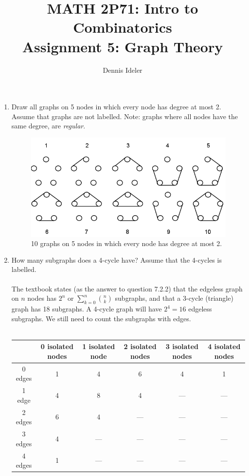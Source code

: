 \documentclass[10pt,a4paper,final]{article}
\author{Dennis Ideler}
\title{MATH 2P71: Intro to Combinatorics\\Assignment 5: Graph Theory}
\begin{document}
\maketitle

\begin{enumerate}
\item %
Draw all graphs on 5 nodes in which every node has degree at most 2. Assume that graphs are not labelled.
Note: graphs where all nodes have the same degree, are \emph{regular}.


\begin{figure}[h!]
  \centering
    \includegraphics[scale=0.5]{q1.png}
  \caption{10 graphs on 5 nodes in which every node has degree at most 2.}
  \label{q1}
\end{figure}

\item %
How many subgraphs does a 4-cycle have? Assume that the 4-cycles is labelled. \\
\\
The textbook states (as the answer to question 7.2.2) that the edgeless graph on $n$ nodes
has $2^n$ or $\sum_{k=0}^n \binom{n}{k}$ subgraphs, and that a 3-cycle (triangle) graph
has 18 subgraphs. A 4-cycle graph will have $2^4 = 16$ edgeless subgraphs.
We still need to count the subgraphs with edges. \\
\\
\begin{tabular}{|c||c|c|c|c|c|}
\hline 
 & 0 isolated nodes & 1 isolated node & 2 isolated nodes & 3 isolated nodes & 4 isolated nodes \\ 
\hline \hline 
0 edges & 1 & 4 & 6 & 4 & 1 \\ 
\hline 
1 edge &  4 & 8 & 4 & --- & --- \\ 
\hline 
2 edges &  6 & 4 & --- & --- & --- \\ 
\hline 
3 edges &  4 & --- & --- & --- & --- \\ 
\hline 
4 edges &  1 & --- & --- & --- & --- \\ 
\hline 
\end{tabular} 


\end{enumerate}
\end{document}
